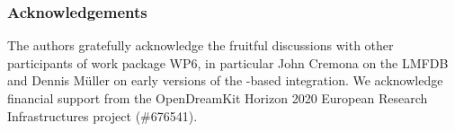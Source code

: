 
\subsubsection*{Acknowledgements}
The authors gratefully acknowledge the fruitful discussions with other participants of
work package WP6, in particular John Cremona on the LMFDB and Dennis M\"uller on early
versions of the \ommt-based integration. We acknowledge financial support from the
OpenDreamKit Horizon 2020 European Research Infrastructures project (\#676541).


